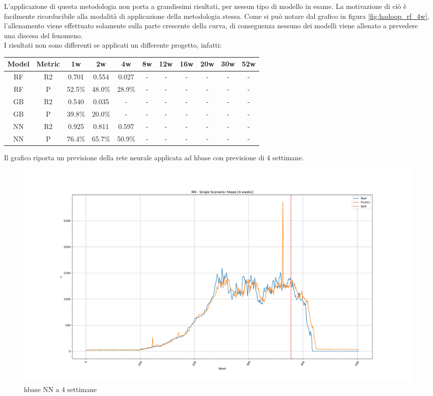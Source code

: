 \documentclass[%
    corpo=12pt,
    twoside,
    oldstyle,
    autoretitolo,
    greek,
    evenboxes,
]{toptesi}
\begin{document}
L'applicazione di questa metodologia non porta a grandissimi risultati, per nessun tipo di modello in esame. La motivazione di ciò è facilmente ricorducibile alla modalità di applicazione della metodologia stessa. Come si può notare dal grafico in figura \ref{fig:hadoop_rf_4w}, l'allenamento viene effettuato solamente sulla parte crescente della curva, di conseguenza nessuno dei modelli viene allenato a prevedere una discesa del fenomeno.\\
I risultati non sono differenti se applicati un differente progetto, infatti:
\begin{center}
   \label{tab:single_scen_hbase}
  \begin{tabular}{ |c|c|c|c|c|c|c|c|c|c|c| }
    \hline
    \textbf{Model} & \textbf{Metric} & \textbf{1w} & \textbf{2w} & \textbf{4w} & \textbf{8w} & \textbf{12w} & \textbf{16w} & \textbf{20w} & \textbf{30w}  & \textbf{52w} \\
    \hline
    \hline
    RF & R2 & 0.701 & 0.554 & 0.027 & - & - & - & - & - & -\\
    \hline
    RF & P & 52.5\% & 48.0\% & 28.9\% & - & - & - & - & - & -\\
    \hline
    \hline
    GB & R2 & 0.540 & 0.035 & - & - & - & - & - & - & -\\
    \hline
    GB & P & 39.8\% & 20.0\% & - & - & - & - & - & - & -\\
    \hline
    \hline
    NN & R2 & 0.925 & 0.811 & 0.597 & - & - & - & - & - & -\\
    \hline
    NN & P & 76.4\% & 65.7\% & 50.9\% & - & - & - & - & - & -\\
    \hline
  \end{tabular}
\end{center}
Il grafico riporta un previsione della rete neurale applicata ad hbase con previsione di 4 settimane.
\begin{figure}[!ht]
  \includegraphics[width=\linewidth]{figure/hbase_nn_4w.png}
  \caption{hbase NN a 4 settimane}
  \label{fig:hbase_nn_4w}
\end{figure}
\end{document}
